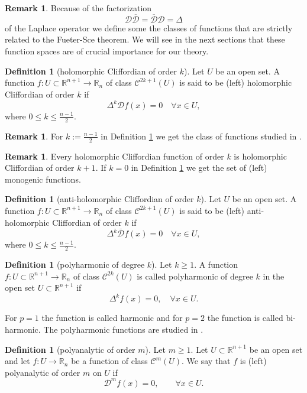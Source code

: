 \documentclass[reqno,11pt]{amsart}
\numberwithin{equation}{section}
\theoremstyle{definition}
\newtheorem{remark}[theorem]{{\bf Remark}}
\newtheorem{definition}[theorem]{Definition}
\begin{document}
\begin{remark}
Because of the factorization
$$
\mathcal{D}\mathcal{\overline{D}}=\mathcal{\overline{D}}\mathcal{D}=\Delta
$$
of the Laplace operator
we define some the classes of functions that are strictly related to the Fueter-Sce theorem.
 We will see in the next sections that these function spaces are of crucial importance for our theory.
\end{remark}
\begin{definition}[holomorphic Cliffordian of order $k$]
	\label{hc}
	Let $U$ be an open set. A function $f:U \subset \mathbb{R}^{n+1} \to \mathbb{R}_n$ of class $\mathcal{C}^{2k+1}(U)$ is said to be (left) holomorphic Cliffordian of order $k$ if
	$$ \Delta^k \mathcal{D}  f(x)=0\quad \forall x\in U,$$
	where $0 \leq k \leq \frac{n-1}{2}$.
\end{definition}
\begin{remark}
	For $k:= \frac{n-1}{2}$ in Definition \ref{hc} we get the class of functions studied in \cite{LR}.
\end{remark}
\begin{remark}
	Every holomorphic Cliffordian function of order $k$ is holomorphic Cliffordian of order $k+1$. If $k=0$ in Definition \ref{hc} we get the set of (left) monogenic functions.
\end{remark}
\begin{definition}[anti-holomorphic Cliffordian of order $k$]
	\label{anti1}
	Let $U$ be an open set. A function $f:U \subset \mathbb{R}^{n+1} \to \mathbb{R}_n$ of class $\mathcal{C}^{2k+1}(U)$ is said to be (left) anti-holomorphic Cliffordian of order $k$ if
	$$ \Delta^k \mathcal{\overline{D}}  f(x)=0\quad \forall x\in U,$$
	where $0 \leq k \leq \frac{n-1}{2}$.
\end{definition}
\begin{definition}[polyharmonic of degree $k$]
	\label{harmo}
	Let $k \geq 1$. A function $f:U \subset \mathbb{R}^{n+1} \to \mathbb{R}_n$ of class $\mathcal{C}^{2k}(U)$ is called polyharmonic of degree $k$ in the open set $U \subset \mathbb{R}^{n+1}$ if
	$$ \Delta^k f(x)=0, \quad\forall x \in U.$$
\end{definition}
For $p=1$ the function is called harmonic and for $p=2$ the function is called bi-harmonic. The polyharmonic functions are studied in \cite{A}.
\begin{definition}[polyanalytic of order $m$]
	\label{poly}
	Let $ m \geq 1$. Let $ U \subset \mathbb{R}^{n+1}$ be an open set and let $f:U \to \mathbb{R}_n$ be a function of class $ \mathcal{C}^{m}(U)$. We say that $f$ is (left) polyanalytic of order $m$ on $U$ if
	$$ \mathcal{D}^{m}f(x)=0, \qquad \forall x \in U.$$
\end{definition}
\end{document}
